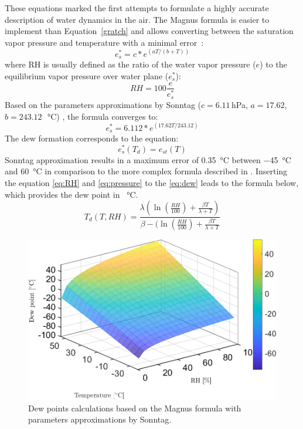 These equations marked the first attempts to formulate a highly accurate description of water dynamics in the air. The Magnus formula is easier to implement than Equation~\ref{gratch} and allows converting between the saturation vapor pressure and temperature with a minimal error~\cite{magnus}: 
\begin{equation}
    e^{*}_{s} = c*e^{(aT/(b+T))}
\end{equation}
where \gls{RH} is usually defined as the ratio of the water vapor pressure ($e$) to the equilibrium vapor pressure over water plane ($e^{*}_{s}$):
\begin{equation}
    RH = 100\frac{e}{e^{*}_{s}}
    \label{eq:RH}
\end{equation}
Based on the parameters approximations by Sonntag ($c=6.11$\,hPa, $a=17.62$, $b=243.12$\,\SI{}{\celsius}) \cite{magnus}, the formula converges to:
\begin{equation}
    e^{*}_{s} = 6.112*e^{(17.62T/243.12)}
    \label{eq:pressure}
\end{equation}
The dew formation corresponds to the equation:
\begin{equation}
    e^{*}_{s}(T_{d}) = e_{st}(T)
    \label{eq:dew}
\end{equation}
Sonntag approximation results in a maximum error of \SI{0.35}{\celsius} between \SI{-45}{\celsius} and \SI{60}{\celsius} in comparison to the more complex formula described in \cite{hardy}. 
Inserting the equation \ref{eq:RH} and \ref{eq:pressure} to the \ref{eq:dew} leads to the formula below, which provides the dew point in \SI{}{\celsius}.
\begin{equation}
    T_{d}(T, RH) = \frac{\lambda(\ln(\frac{RH}{100})+\frac{\beta T}{\lambda + T})}{\beta - (\ln(\frac{RH}{100})+\frac{\beta T}{\lambda + T}}
    \label{eq:td}
\end{equation}
\begin{figure}[!h]
\centering
\includegraphics[width=0.65\columnwidth]{Chapter5/images/dewpointmagnus.png}
\caption{Dew points calculations based on the Magnus formula with parameters approximations by Sonntag.}
\label{fig:dewpointmagnus}
\end{figure}

